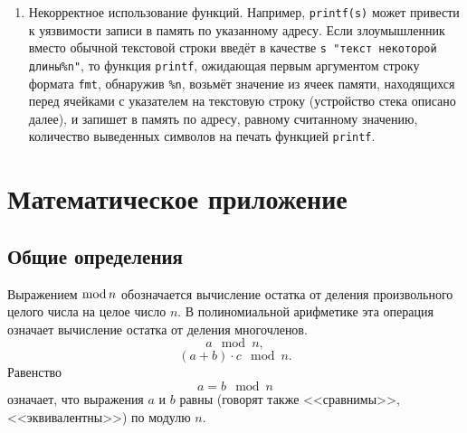 \begin{enumerate}
\begin{enumerate}
        \end{enumerate}
    \item Некорректное использование функций. Например, \texttt{printf(s)} может привести к уязвимости записи в память по указанному адресу. Если злоумышленник вместо обычной текстовой строки введёт в качестве \texttt{s "текст некоторой длины\%n"}, то функция \texttt{printf}, ожидающая первым аргументом строку формата \texttt{fmt}, обнаружив \texttt{\%n}, возьмёт значение из ячеек памяти, находящихся перед ячейками с указателем на текстовую строку (устройство стека описано далее), и запишет в память по адресу, равному считанному значению, количество выведенных символов на печать функцией \texttt{printf}.
\end{enumerate}










\appendix
\renewcommand{\thechapter}{\Asbuk{chapter}} %

\chapter{Математическое приложение}\label{chap:discrete-math}

\section{Общие определения}

Выражением $\operatorname{mod} n$ обозначается вычисление остатка от деления произвольного целого числа на целое число $n$. В полиномиальной арифметике эта операция означает вычисление остатка от деления многочленов.
    \[ a\mod n, \]
    \[ (a + b)\cdot c\mod n. \]
Равенство
    \[ a = b \mod n \]
означает, что выражения $a$ и $b$ равны (говорят также <<сравнимы>>, <<эквивалентны>>) по модулю $n$.

